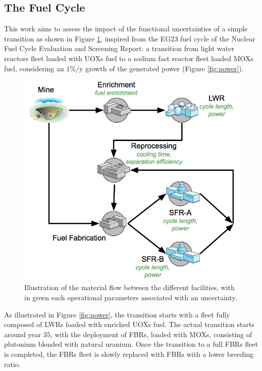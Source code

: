 \documentclass{anstrans}
\begin{document}
\subsection{The Fuel Cycle}
This work aims to assess the impact of the functional uncertainties of a simple
transition as shown in Figure \ref{fig:cycle}, inspired from the EG23 fuel cycle
of the Nuclear Fuel Cycle Evaluation and Screening Report\cite{ES}: a
transition from light water reactors fleet loaded with \glspl{UOX} fuel to a
sodium fast reactor fleet loaded \glspl{MOX} fuel, considering an $1\%/$y growth
of the generated power (Figure \ref{fig:power}).
\begin{figure}[ht] %
  \centering
  \includegraphics[scale=0.31]{cycle.png}
  \caption{Illustration of the material flow between the different facilities,
  with in green each operational parameters associated with an
  uncertainty.}\label{fig:cycle}
\end{figure}

As illustrated in Figure \ref{fig:power}, the transition starts with a fleet
fully composed of \glspl{LWR} loaded with enriched \glspl{UOX} fuel. The actual
transition starts around year 35, with the deployment of \glspl{FBR}, loaded
with \glspl{MOX}, consisting of plutonium blended with natural
uranium. Once the transition to a full \glspl{FBR} fleet is completed, the
\glspl{FBR} fleet is slowly replaced with \glspl{FBR} with a lower breeding
ratio.
\end{document}
